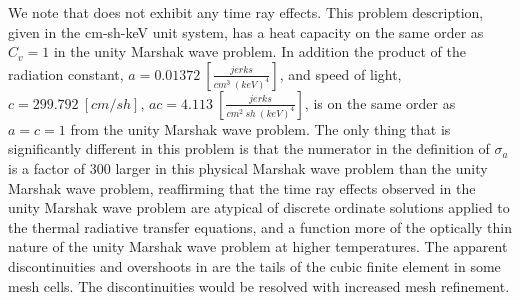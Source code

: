 We note that  does not exhibit any time ray effects.  
This problem description, given in the cm-sh-keV unit system, has a heat capacity on the same order as $C_v=1$ in the unity Marshak wave problem.  
In addition the product of the radiation constant, $a = 0.01372~[\frac{jerks}{cm^3~(keV)^4}]$, and speed of light, $c=299.792~[cm/sh]$, $ac = 4.113~\left[\frac{jerks}{cm^2~sh~(keV)^4}\right]$, is on the same order as $a=c=1$ from the unity Marshak wave problem.
The only thing that is significantly different in this problem is that the numerator in the definition of $\sigma_a$ is a factor of 300 larger in this physical Marshak wave problem than the unity Marshak wave problem, reaffirming that the time ray effects observed in the unity Marshak wave problem are atypical of discrete ordinate solutions applied to the thermal radiative transfer equations, and a function more of the optically thin nature of the unity Marshak wave problem at higher temperatures.
The apparent discontinuities and overshoots in  are the tails of the cubic finite element in some mesh cells.
The discontinuities would be resolved with increased mesh refinement.

